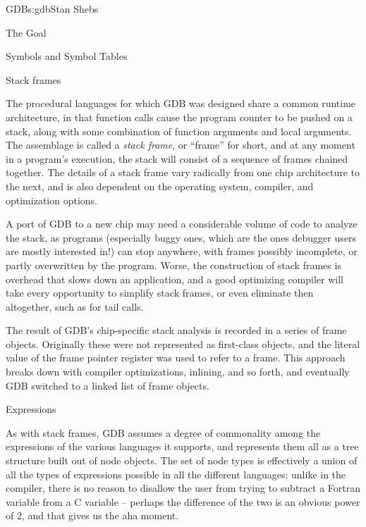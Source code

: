 \begin{aosachapter}{GDB}{s:gdb}{Stan Shebs}
\begin{aosasect1}{The Goal}
\begin{aosasect2}{Symbols and Symbol Tables}
\end{aosasect2}

\begin{aosasect2}{Stack frames}

The procedural languages for which GDB was designed share a common
runtime architecture, in that function calls cause the program counter
to be pushed on a stack, along with some combination of function
arguments and local arguments.  The assemblage is called a {\em stack
frame}, or ``frame'' for short, and at any moment in a program's
execution, the stack will consist of a sequence of frames chained
together.  The details of a stack frame vary radically from one chip
architecture to the next, and is also dependent on the operating
system, compiler, and optimization options.

A port of GDB to a new chip may need a considerable volume of code to
analyze the stack, as programs (especially buggy ones, which are the
ones debugger users are mostly interested in!) can stop anywhere, with
frames possibly incomplete, or partly overwritten by the program.
Worse, the construction of stack frames is overhead that slows down an
application, and a good optimizing compiler will take every
opportunity to simplify stack frames, or even eliminate then
altogether, such as for tail calls.

The result of GDB's chip-specific stack analysis is recorded in a
series of frame objects.  Originally these were not represented as
first-class objects, and the literal value of the frame pointer
register was used to refer to a frame.  This approach breaks down with
compiler optimizations, inlining, and so forth, and eventually GDB
switched to a linked list of frame objects.

\end{aosasect2}

\begin{aosasect2}{Expressions}

As with stack frames, GDB assumes a degree of commonality among the
expressions of the various languages it supports, and represents them
all as a tree structure built out of node objects.  The set of node
types is effectively a union of all the types of expressions possible
in all the different languages; unlike in the compiler, there is no
reason to disallow the user from trying to subtract a Fortran variable
from a C variable -- perhaps the difference of the two is an obvious
power of 2, and that gives us the aha moment.

\end{aosasect2}


\end{aosasect1}
\end{aosachapter}
